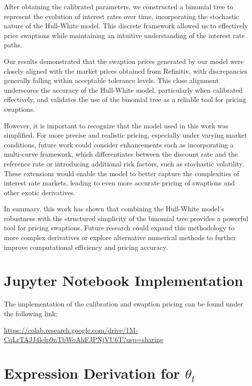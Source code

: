 \documentclass[titlepage, 12pt]{article}
\begin{document}
	After obtaining the calibrated parameters, we constructed a binomial tree to represent the evolution of interest rates over time, incorporating the stochastic nature of the Hull-White model. This discrete framework allowed us to effectively price swaptions while maintaining an intuitive understanding of the interest rate paths.
	
	Our results demonstrated that the swaption prices generated by our model were closely aligned with the market prices obtained from Refinitiv, with discrepancies generally falling within acceptable tolerance levels. This close alignment underscores the accuracy of the Hull-White model, particularly when calibrated effectively, and validates the use of the binomial tree as a reliable tool for pricing swaptions.
	
	However, it is important to recognize that the model used in this work was simplified. For more precise and realistic pricing, especially under varying market conditions, future work could consider enhancements such as incorporating a multi-curve framework, which differentiates between the discount rate and the reference rate or introducing additional risk factors, such as stochastic volatility. These extensions would enable the model to better capture the complexities of interest rate markets, leading to even more accurate pricing of swaptions and other exotic derivatives.
	
	In summary, this work has shown that combining the Hull-White model's robustness with the structured simplicity of the binomial tree provides a powerful tool for pricing swaptions. Future research could expand this methodology to more complex derivatives or explore alternative numerical methods to further improve computational efficiency and pricing accuracy.
	
	\newpage
	\appendix
	\section{Jupyter Notebook Implementation}
	
	The implementation of the calibration and swaption pricing can be found under the following link:
	
	\url{https://colab.research.google.com/drive/1M-CqLrTAJJ4lelp9nTbWoAhFJPNjVU6T?usp=sharing}
	
	\section{Expression Derivation for $\theta_t$}
	
\end{document}
